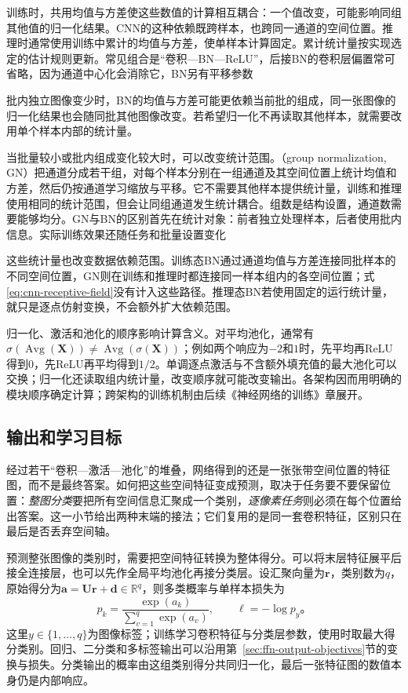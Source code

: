 训练时，共用均值与方差使这些数值的计算相互耦合：一个值改变，可能影响同组其他值的归一化结果。CNN的这种依赖既跨样本，也跨同一通道的空间位置。推理时通常使用训练中累计的均值与方差，使单样本计算固定。累计统计量按实现选定的估计规则更新。常见组合是“卷积—BN—ReLU”，后接BN的卷积层偏置常可省略，因为通道中心化会消除它，BN另有平移参数

批内独立图像变少时，BN的均值与方差可能更依赖当前批的组成，同一张图像的归一化结果也会随同批其他图像改变。若希望归一化不再读取其他样本，就需要改用单个样本内部的统计量。

当批量较小或批内组成变化较大时，可以改变统计范围。（group normalization, GN）把通道分成若干组，对每个样本分别在一组通道及其空间位置上统计均值和方差，然后仍按通道学习缩放与平移。它不需要其他样本提供统计量，训练和推理使用相同的统计范围，但会让同组通道发生统计耦合。组数是结构设置，通道数需要能够均分。GN与BN的区别首先在统计对象：前者独立处理样本，后者使用批内信息。实际训练效果还随任务和批量设置变化

这些统计量也改变数据依赖范围。训练态BN通过通道均值与方差连接同批样本的不同空间位置，GN则在训练和推理时都连接同一样本组内的各空间位置；式\eqref{eq:cnn-receptive-field}没有计入这些路径。推理态BN若使用固定的运行统计量，就只是逐点仿射变换，不会额外扩大依赖范围。

归一化、激活和池化的顺序影响计算含义。对平均池化，通常有$\sigma(\operatorname{Avg}(\bm X))\neq\operatorname{Avg}(\sigma(\bm X))$；例如两个响应为$-2$和$1$时，先平均再ReLU得到$0$，先ReLU再平均得到$1/2$。单调逐点激活与不含额外填充值的最大池化可以交换；归一化还读取组内统计量，改变顺序就可能改变输出。各架构因而用明确的模块顺序确定计算；跨架构的训练机制由后续《神经网络的训练》章展开。

\subsection{输出和学习目标}
\label{sec:cnn-output-objectives}

经过若干“卷积—激活—池化”的堆叠，网络得到的还是一张张带空间位置的特征图，而不是最终答案。如何把这些空间特征变成预测，取决于任务要不要保留位置：\emph{整图分类}要把所有空间信息汇聚成一个类别，\emph{逐像素任务}则必须在每个位置给出答案。这一小节给出两种末端的接法；它们复用的是同一套卷积特征，区别只在最后是否丢弃空间轴。

预测整张图像的类别时，需要把空间特征转换为整体得分。可以将末层特征展平后接全连接层，也可以先作全局平均池化再接分类层。设汇聚向量为$\bm r$，类别数为$q$，原始得分为$\bm a=\bm U\bm r+\bm d\in\mathbb R^q$，则多类概率与单样本损失为
\begin{equation}
  p_k=\frac{\exp(a_k)}{\sum_{v=1}^{q}\exp(a_v)},\qquad
  \ell=-\log p_y\text{。}
  \label{eq:cnn-image-classification}
\end{equation}
这里$y\in\{1,\ldots,q\}$为图像标签；训练学习卷积特征与分类层参数，使用时取最大得分类别。回归、二分类和多标签输出可以沿用第~\ref{sec:ffn-output-objectives}节的变换与损失。分类输出的概率由这组类别得分共同归一化，最后一张特征图的数值本身仍是内部响应。

